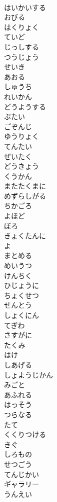 \documentclass[8pt]{extreport}
\begin{document}
\begin{CJK}{UTF8}{min}
\\	はいかいする
\\	おびる
\\	はくりょく
\\	ていど
\\	じっしする
\\	つうじょう
\\	せいき
\\	あおる
\\	しゅうち
\\	れいかん
\\	どうようする
\\	ぶたい
\\	ごぞんじ
\\	ゆうりょく
\\	てんたい
\\	ぜいたく
\\	どうきょう
\\	くうかん
\\	またたくまに
\\	めずらしがる
\\	ちかごろ
\\	よほど
\\	ぼろ
\\	きょくたんに
\\	よ
\\	まとめる
\\	めいうつ
\\	けんちく
\\	ひじょうに
\\	ちょくせつ
\\	せんとう
\\	しょくにん
\\	てぎわ
\\	さすがに
\\	たくみ
\\	はけ
\\	しあげる
\\	しょようじかん
\\	みごと
\\	あふれる
\\	はっそう
\\	つらなる
\\	たて
\\	くくりつける
\\	きぐ
\\	しろもの
\\	せつごう
\\	てんじかい
\\	ギャラリー
\\	うんえい

\end{CJK}
\end{document}
